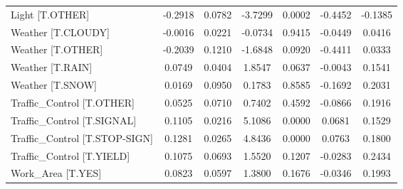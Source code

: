 \begin{longtable}{p{4cm}cccccc}
Light [T.OTHER]                               & -0.2918 &    0.0782 & -3.7299 &       0.0002 & -0.4452 & -0.1385 \\
Weather [T.CLOUDY]                            & -0.0016 &    0.0221 & -0.0734 &       0.9415 & -0.0449 &  0.0416 \\
Weather [T.OTHER]                             & -0.2039 &    0.1210 & -1.6848 &       0.0920 & -0.4411 &  0.0333 \\
Weather [T.RAIN]                              &  0.0749 &    0.0404 &  1.8547 &       0.0637 & -0.0043 &  0.1541 \\
Weather [T.SNOW]                              &  0.0169 &    0.0950 &  0.1783 &       0.8585 & -0.1692 &  0.2031 \\
Traffic\_Control [T.OTHER]                     &  0.0525 &    0.0710 &  0.7402 &       0.4592 & -0.0866 &  0.1916 \\
Traffic\_Control [T.SIGNAL]                    &  0.1105 &    0.0216 &  5.1086 &       0.0000 &  0.0681 &  0.1529 \\
Traffic\_Control [T.STOP-SIGN]                 &  0.1281 &    0.0265 &  4.8436 &       0.0000 &  0.0763 &  0.1800 \\
Traffic\_Control [T.YIELD]                     &  0.1075 &    0.0693 &  1.5520 &       0.1207 & -0.0283 &  0.2434 \\
Work\_Area [T.YES]                             &  0.0823 &    0.0597 &  1.3800 &       0.1676 & -0.0346 &  0.1993 \\
\end{longtable}
